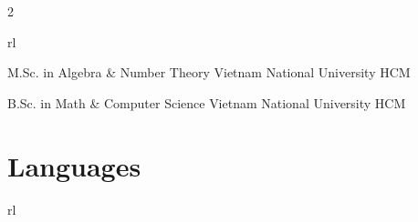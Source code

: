 \documentclass[11pt]{article} %
\begin{document}
\begin{paracol}{2}
\begin{supertabular}{rl}
	
	{M.Sc. in Algebra \& Number Theory} %
	{} %
    {} %
	{Vietnam National University HCM} %
	
	
	{B.Sc. in Math \& Computer Science} %
	{} %
    {} %
	{Vietnam National University HCM} %
	

\end{supertabular}



	



\medskip %


\section{Languages}

\begin{supertabular}{rl}


\end{supertabular}    


\end{paracol}
\end{document}
